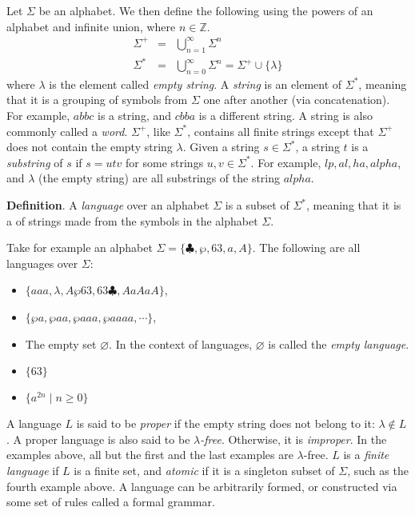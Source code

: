 \documentclass[12pt]{article}
\begin{document}
Let $\Sigma$ be an alphabet. We then define the following using the
powers of an alphabet and infinite union, where $n \in \mathbb{Z}$.
\begin{eqnarray*}
\Sigma^+ & = & \bigcup_{n=1}^{\infty} \Sigma^n \\
\Sigma^* & = & \bigcup_{n=0}^{\infty} \Sigma^n = \Sigma^+ \cup \{\lambda\}
\end{eqnarray*}
where $\lambda$ is the element called \emph{empty string}.
A \emph{string} is an element of $\Sigma^*$, meaning that
it is a grouping of symbols from $\Sigma$ one after another (via concatenation). For example, $abbc$ is a
string, and $cbba$ is a different string.  A string is also commonly called a \emph{word}.  
$\Sigma^+$, like $\Sigma^*$, contains all finite strings except that
$\Sigma^+$ does not contain the empty string $\lambda$.
Given a string $s\in\Sigma^*$, a string $t$ is a \emph{substring} of $s$ if
$s = utv$ for some strings $u,v\in\Sigma^*$.  For example, $lp, al, ha, alpha$, and $\lambda$ (the empty string) are all substrings of the string $alpha$.

\textbf{Definition}.  A \emph{language} over an alphabet $\Sigma$ is a subset of $\Sigma^*$, meaning that
it is a  of strings made from the symbols in the alphabet $\Sigma$.

Take for example an alphabet $\Sigma = \{\clubsuit, \wp, 63, a, A \}$.
The following are all languages over $\Sigma$:
\begin{itemize}
\item 
$\{aaa, \lambda, A\wp63, 63\clubsuit, AaAaA\}$, 
\item 
$\{\wp a,\wp aa, \wp aaa, \wp aaaa, \cdots\}$, 
\item The empty set $ \varnothing $.  In the context of languages, $\varnothing$ is called the \emph{empty language}.
\item $\lbrace 63 \rbrace$
\item $\lbrace a^{2n}\mid n\ge 0 \rbrace$
\end{itemize}
A language $L$ is said to be \emph{proper} if the empty string does not belong to it: $\lambda\notin L$.  A proper language is also said to be \emph{$\lambda$-free}.  Otherwise, it is \emph{improper}.  In the examples above, all but the first and the last examples are $\lambda$-free.  $L$ is a \emph{finite language} if $L$ is a finite set, and \emph{atomic} if it is a singleton subset of $\Sigma$, such as the fourth example above.  A language can be arbitrarily formed, or constructed via some set of rules called a formal grammar.
\end{document}
